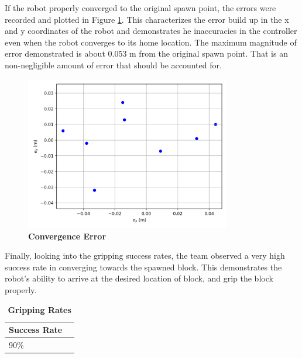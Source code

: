         If the robot properly converged to the original spawn point, the errors were recorded and plotted in Figure \ref{fig:errorxy}. This characterizes the error build up in the x and y coordinates of the robot and demonstrates he inaccuracies in the controller even when the robot converges to its home location. The maximum magnitude of error demonstrated is about 0.053 m from the original spawn point. That is an non-negligible amount of error that should be accounted for.
        
        \begin{figure}[htp]
        	\begin{center}
        	\includegraphics[width=0.8\textwidth]{pictures/Figure_2.png}
        	\caption{\textbf{Convergence Error}}
        	\label{fig:errorxy}
        	\end{center}
        \end{figure}
        
        Finally, looking into the gripping success rates, the team observed a very high success rate in converging towards the spawned block. This demonstrates the robot's ability to arrive at the desired location of block, and grip the block properly. 
        
        \begin{table}[H]
            \begin{center}
            \caption{\textbf{Gripping Rates}}
            \label{table:gripping}
            \begin{tabular}{|p{1.8in}|p{1.8in}|}
                \hline
                \textbf{Success Rate} \\ \hline
                90\% \\ \hline
            \end{tabular}
            \end{center}
        \end{table}  
        
